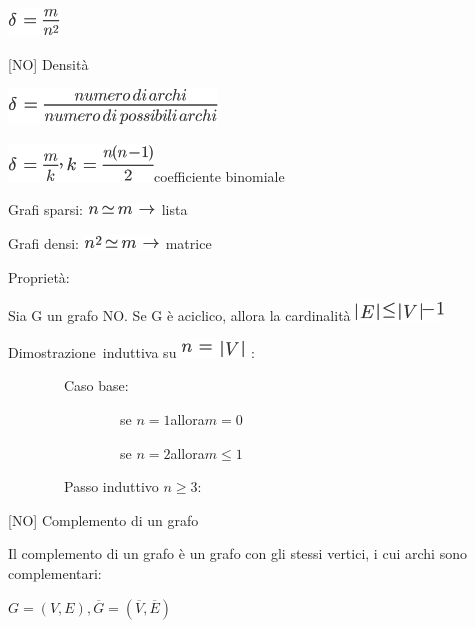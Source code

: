 \documentclass{article}
\begin{document}
\includegraphics{images/image392.png}

{}

{{[}NO{]} Densità}

\includegraphics{images/image393.png}

\includegraphics{images/image394.png}{coefficiente binomiale}

{}

{Grafi sparsi: }\includegraphics{images/image395.png}{~}{lista}

{Grafi densi: }\includegraphics{images/image396.png}{~matrice}

{}

{Proprietà}{:}

{Sia G un grafo NO. }{Se G è aciclico}{, allora la cardinalità
}\includegraphics{images/image397.png}

{}

{Dimostrazione}{~induttiva su }\includegraphics{images/image398.png}{~:}

{~~~~~~~~Caso base:}

{~~~~~~~~~~~~~~~~se }$n=1${allora}$m = 0$

{~~~~~~~~~~~~~~~~se }$n=2${allora}$m \leq 1$

{~~~~~~~~Passo induttivo $n \geq 3$:}



{{[}NO{]} Complemento di un grafo}

{Il complemento di un grafo è un grafo con gli stessi vertici, i cui
archi sono complementari:}

$G=(V,E), \overline{G}=(\overline{V},\overline{E})$
\end{document}
